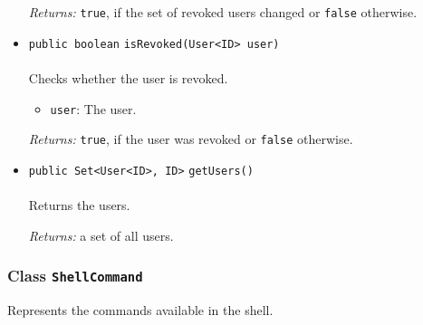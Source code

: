 \begin{itemize}
\emph{Returns:} \lstinline|true|, if the set of revoked users changed or \lstinline|false| otherwise.

\item \lstinline|public boolean| \lstinline|isRevoked|\lstinline|(User<ID> user)|\\ \\[-0.6em]
Checks whether the user is revoked.
\begin{itemize}
\item \lstinline|user|: The user.
\end{itemize}

\emph{Returns:} \lstinline|true|, if the user was revoked or \lstinline|false| otherwise.

\item \lstinline|public Set<User<ID>, ID>| \lstinline|getUsers|\lstinline|()|\\ \\[-0.6em]
Returns the users.

\emph{Returns:} a set of all users.

\end{itemize}

\subsubsection{Class \lstinline|ShellCommand|}
Represents the commands available in the shell. \\
\noindent\begin{minipage}[t]{5cm}
\vspace{0.3em}
\hspace*{2em}
\vspace{0.3em}
\end{minipage}




